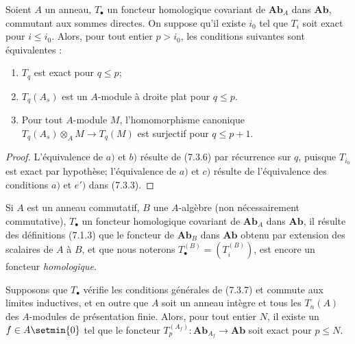 \begin{proposition}[7.3.7]
Soient $A$ un anneau, $T_\bullet$ un foncteur homologique covariant de
$\boldsymbol{Ab}_A$ dans $\boldsymbol{Ab}$, commutant aux sommes directes. On suppose
qu'il existe $i_0$ tel que $T_i$ soit exact pour $i\leq i_0$. Alors, pour tout
entier $p>i_0$, les conditions suivantes sont équivalentes :
\begin{enumerate}
  \item[a)] $T_q$ est exact pour $q\leq p$;
  \item[b)] $T_q(A_s)$ est un $A$-module à droite plat pour $q\leq p$.
  \item[c)] Pour tout $A$-module $M$, l'homomorphisme canonique
    $T_q(A_s)\otimes_A M\longrightarrow T_q(M)$
    est surjectif pour $q\leq p+1$.
\end{enumerate}
\end{proposition}

\begin{proof}
L'équivalence de $a)$ et $b)$ résulte de (7.3.6) par récurrence sur $q$,
puisque $T_{i_0}$ est exact par hypothèse; l'équivalence de $a)$ et $c)$
résulte de l'équivalence des conditions $a)$ et $e')$ dans (7.3.3).
\end{proof}


\begin{env}[7.3.8]
Si $A$ est un anneau commutatif, $B$ une $A$-algèbre (non nécessairement
commutative), $T_\bullet$ un foncteur homologique covariant de
$\boldsymbol{Ab}_A$ dans $\boldsymbol{Ab}$, il résulte des définitions (7.1.3) que le
foncteur de $\boldsymbol{Ab}_B$ dans $\boldsymbol{Ab}$ obtenu par extension des
scalaires de $A$ à $B$, et que nous noterons
$T_\bullet^{(B)}=(T_i^{(B)})$,
est encore un foncteur \emph{homologique}.
\end{env}

\begin{corollary}[7.3.9]
Supposons que $T_\bullet$ vérifie les conditions générales de \textup{(7.3.7)} et
commute aux limites inductives, et en outre que $A$ soit un anneau intègre et
tous les $T_n(A)$ des $A$-modules de présentation finie. Alors, pour tout
entier $N$, il existe un $f\in A\setmin\{0\}$ tel que le foncteur
$T_p^{(A_f)}:\boldsymbol{Ab}_{A_f}\longrightarrow\boldsymbol{Ab}$
soit exact pour $p\leq N$.
\end{corollary}

